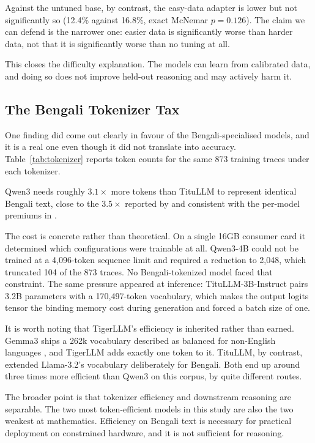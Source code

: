Against the untuned base, by contrast, the easy-data adapter is lower but not
significantly so (12.4\% against 16.8\%, exact McNemar $p=0.126$). The claim we
can defend is the narrower one: easier data is significantly worse than harder
data, not that it is significantly worse than no tuning at all.

This closes the difficulty explanation. The models can learn from calibrated
data, and doing so does not improve held-out reasoning and may actively harm it.

\subsection{The Bengali Tokenizer Tax}
\label{sec:tokenizer}

One finding did come out clearly in favour of the Bengali-specialised models,
and it is a real one even though it did not translate into accuracy.
Table~\ref{tab:tokenizer} reports token counts for the same 873 training
traces under each tokenizer.

Qwen3 needs roughly $3.1\times$ more tokens than TituLLM to represent identical
Bengali text, close to the $3.5\times$ reported by
\textcite{yong2025crosslingual} and consistent with the per-model premiums in
\textcite{petrov2023language}.

The cost is concrete rather than theoretical. On a single 16GB consumer card it
determined which configurations were trainable at all. Qwen3-4B could not be
trained at a 4,096-token sequence limit and required a reduction to 2,048, which
truncated 104 of the 873 traces. No Bengali-tokenized model faced that
constraint. The same pressure appeared at inference: TituLLM-3B-Instruct pairs
3.2B parameters with a 170,497-token vocabulary, which makes the output logits
tensor the binding memory cost during generation and forced a batch size of one.

It is worth noting that TigerLLM's efficiency is inherited rather than earned.
Gemma3 ships a 262k vocabulary described as balanced for non-English languages
\parencite{gemma3}, and TigerLLM adds exactly one token to it. TituLLM, by
contrast, extended Llama-3.2's vocabulary deliberately for Bengali. Both end up
around three times more efficient than Qwen3 on this corpus, by quite different
routes.

The broader point is that tokenizer efficiency and downstream reasoning are
separable. The two most token-efficient models in this study are also the two
weakest at mathematics. Efficiency on Bengali text is necessary for practical
deployment on constrained hardware, and it is not sufficient for reasoning.

